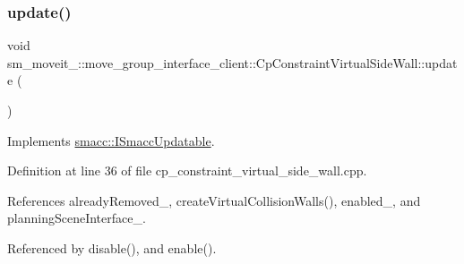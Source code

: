 \subsubsection{\texorpdfstring{update()}{update()}}
{\footnotesize\ttfamily void sm\+\_\+moveit\+\_\+::move\+\_\+group\+\_\+interface\+\_\+client\+::\+Cp\+Constraint\+Virtual\+Side\+Wall\+::update (\begin{DoxyParamCaption}{ }\end{DoxyParamCaption})\hspace{0.3cm}{\ttfamily [virtual]}}



Implements \hyperlink{classsmacc_1_1ISmaccUpdatable_a84ee0520cbefdb1d412bed54650b028e}{smacc\+::\+I\+Smacc\+Updatable}.



Definition at line 36 of file cp\+\_\+constraint\+\_\+virtual\+\_\+side\+\_\+wall.\+cpp.



References already\+Removed\+\_\+, create\+Virtual\+Collision\+Walls(), enabled\+\_\+, and planning\+Scene\+Interface\+\_\+.



Referenced by disable(), and enable().


